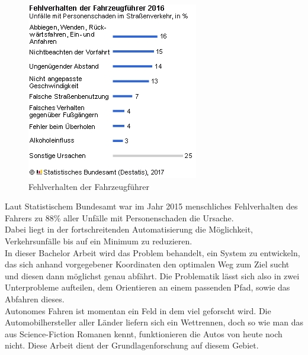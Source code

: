 \begin{figure}[htb]
  \centering  
  \includegraphics[scale=0.8]{img/Verkehrsunfaelle_Fehlverhalten.jpg}
  \caption{Fehlverhalten der Fahrzeugführer\cite{link}}
  \label{fig:Fehlverhalten}
\end{figure}
Laut Statistischem Bundesamt war im Jahr 2015 menschliches Fehlverhalten des Fahrers zu 88\% aller Unfälle mit Personenschaden die Ursache\cite{bild1}. \\
Dabei liegt in der fortschreitenden Automatisierung die Möglichkeit, Verkehrsunfälle bis auf ein Minimum zu reduzieren. \\
In dieser Bachelor Arbeit wird das Problem behandelt, ein System zu entwickeln, das sich anhand vorgegebener Koordinaten den optimalen Weg zum Ziel sucht und diesen dann möglichst genau abfährt. Die Problematik lässt sich also in zwei Unterprobleme aufteilen, dem Orientieren an einem passenden Pfad, sowie das Abfahren dieses. \\
Autonomes Fahren ist momentan ein Feld in dem viel geforscht wird. Die Automobilhersteller aller Länder liefern sich ein Wettrennen, doch so wie man das aus Science-Fiction Romanen kennt, funktionieren die Autos von heute noch nicht. Diese Arbeit dient der Grundlagenforschung auf diesem Gebiet. \newpage


